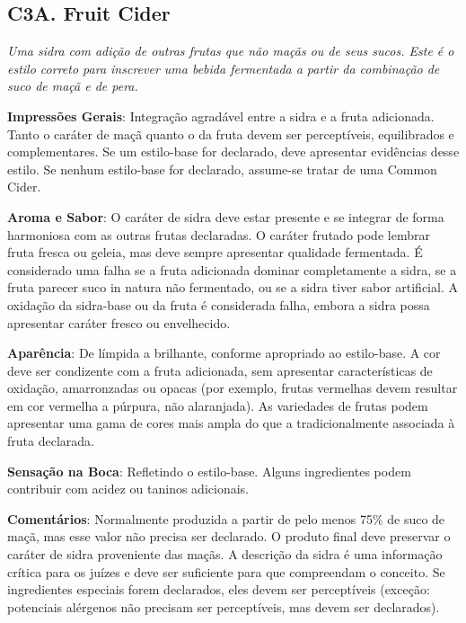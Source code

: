 \subsection*{C3A. Fruit Cider}

\textit{Uma sidra com adição de outras frutas que não maçãs ou de seus sucos. Este é o estilo correto para inscrever uma bebida fermentada a partir da combinação de suco de maçã e de pera.}

\textbf{Impressões Gerais}: Integração agradável entre a sidra e a fruta adicionada. Tanto o caráter de maçã quanto o da fruta devem ser perceptíveis, equilibrados e complementares. Se um estilo-base for declarado, deve apresentar evidências desse estilo. Se nenhum estilo-base for declarado, assume-se tratar de uma Common Cider.

\textbf{Aroma e Sabor}: O caráter de sidra deve estar presente e se integrar de forma harmoniosa com as outras frutas declaradas. O caráter frutado pode lembrar fruta fresca ou geleia, mas deve sempre apresentar qualidade fermentada. É considerado uma falha se a fruta adicionada dominar completamente a sidra, se a fruta parecer suco in natura não fermentado, ou se a sidra tiver sabor artificial. A oxidação da sidra-base ou da fruta é considerada falha, embora a sidra possa apresentar caráter fresco ou envelhecido.

\textbf{Aparência}: De límpida a brilhante, conforme apropriado ao estilo-base. A cor deve ser condizente com a fruta adicionada, sem apresentar características de oxidação, amarronzadas ou opacas (por exemplo, frutas vermelhas devem resultar em cor vermelha a púrpura, não alaranjada). As variedades de frutas podem apresentar uma gama de cores mais ampla do que a tradicionalmente associada à fruta declarada.

\textbf{Sensação na Boca}: Refletindo o estilo-base. Alguns ingredientes podem contribuir com acidez ou taninos adicionais.

\textbf{Comentários}: Normalmente produzida a partir de pelo menos 75\% de suco de maçã, mas esse valor não precisa ser declarado. O produto final deve preservar o caráter de sidra proveniente das maçãs. A descrição da sidra é uma informação crítica para os juízes e deve ser suficiente para que compreendam o conceito. Se ingredientes especiais forem declarados, eles devem ser perceptíveis (exceção: potenciais alérgenos não precisam ser perceptíveis, mas devem ser declarados).

